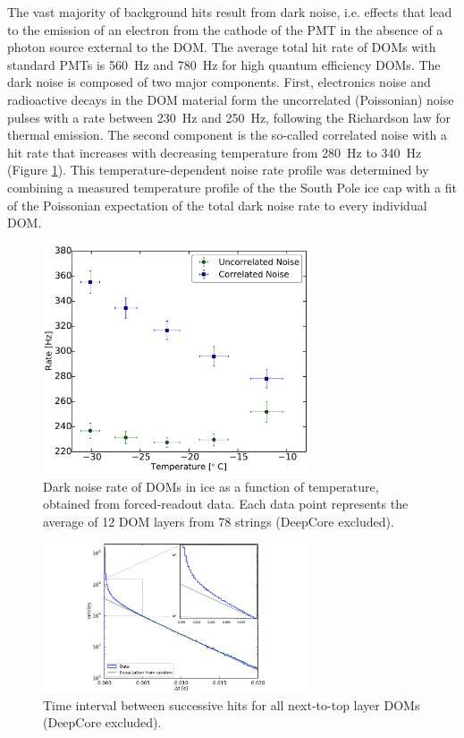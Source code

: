 The vast majority of background hits result from dark noise, i.e. effects
that lead to the emission of an electron from the cathode of the PMT in the
absence of a photon source external to the DOM. The average total hit rate of
DOMs with standard PMTs is \SI{560}{\hertz} and \SI{780}{\hertz} for high
quantum efficiency DOMs. The dark noise is composed of two major 
components.  First, electronics noise and radioactive decays in the DOM material form
the uncorrelated (Poissonian) noise pulses with a rate between
\SI{230}{\hertz} and \SI{250}{\hertz}, following the Richardson law for
thermal emission.  The second component is the so-called correlated
noise with a hit rate that increases with decreasing temperature from
\SI{280}{\hertz} to \SI{340}{\hertz} (Figure
\ref{fig:dom_darknoise_vs_temperature}).  This temperature-dependent noise
rate profile was determined by combining a measured temperature profile of
the the South Pole ice cap \cite{price2002temperature} with a fit of the
Poissonian expectation of the total dark noise rate to every individual
DOM.

\begin{figure}
  \centering
  \includegraphics[width=0.7\textwidth]{graphics/dom/performance/darknoise/HitRatevsTemp_inice_nomuons_nofit_bigfont.pdf}
  \caption{Dark noise rate of DOMs in ice as a function of temperature, obtained from forced-readout
    data. Each data point represents the average of 12 DOM layers from 78 strings (DeepCore excluded).}
  \label{fig:dom_darknoise_vs_temperature}
\end{figure}

\begin{figure}
  \centering
  \includegraphics[width=0.7\textwidth]{graphics/dom/performance/darknoise/DarkNoise_Layer2Doms.pdf}
 \caption{Time interval between successive hits for all next-to-top layer DOMs (DeepCore excluded).}
 \label{fig:darknoise_deltaT}
\end{figure}

